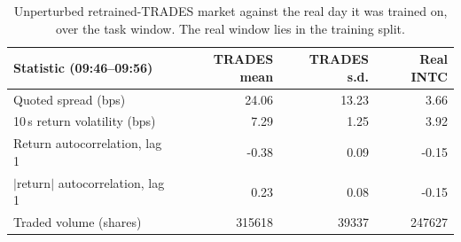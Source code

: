\begin{table}[!htbp]
\centering\small
\caption{Unperturbed retrained-TRADES market against the real day it was trained on, over the task window. The real window lies in the training split.}\label{tab:tradesreal}
\begin{tabular}{lrrr}
\toprule
Statistic (09:46--09:56) & TRADES mean & TRADES s.d. & Real INTC \\
\midrule
Quoted spread (bps) & 24.06 & 13.23 & 3.66 \\
10\,s return volatility (bps) & 7.29 & 1.25 & 3.92 \\
Return autocorrelation, lag 1 & -0.38 & 0.09 & -0.15 \\
$|$return$|$ autocorrelation, lag 1 & 0.23 & 0.08 & -0.15 \\
Traded volume (shares) & 315618 & 39337 & 247627 \\
\bottomrule
\end{tabular}
\end{table}
